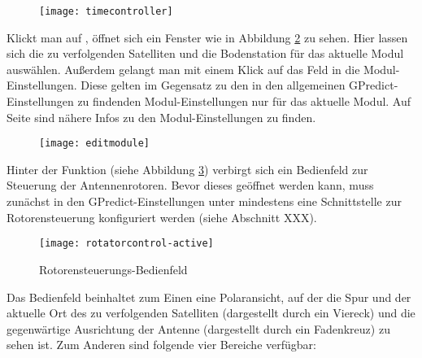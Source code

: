 \begin{figure}[h]
	\centering
	\texttt{[image: timecontroller]}
	\caption{}
	\label{fig:timecontroller} 
\end{figure}

Klickt man auf , öffnet sich ein Fenster wie in Abbildung \ref{fig:editmodule} zu sehen. Hier lassen sich die zu verfolgenden Satelliten und die Bodenstation für das aktuelle Modul auswählen. Außerdem gelangt man mit einem Klick auf das Feld  in die Modul-Einstellungen. Diese gelten im Gegensatz zu den in den allgemeinen GPredict-Einstellungen zu findenden Modul-Einstellungen nur für das aktuelle Modul. Auf Seite \pageref{modulesettingsgeneral} sind nähere Infos zu den Modul-Einstellungen zu finden.
\label{modulesettingsspecific}

\begin{figure}[h]
	\centering
	\texttt{[image: editmodule]}
	\caption{}
	\label{fig:editmodule} 
\end{figure}

\clearpage

Hinter der Funktion  (siehe Abbildung \ref{fig:rotatorcontrol}) verbirgt sich ein Bedienfeld zur Steuerung der Antennenrotoren. Bevor dieses geöffnet werden kann, muss zunächst in den GPredict-Einstellungen unter  mindestens eine Schnittstelle zur Rotorensteuerung konfiguriert werden (siehe Abschnitt XXX). 
\begin{figure}[h]
	\centering
	\texttt{[image: rotatorcontrol-active]}
	\caption{Rotorensteuerungs-Bedienfeld}
	\label{fig:rotatorcontrol} 
\end{figure}

Das Bedienfeld beinhaltet zum Einen eine Polaransicht, auf der die Spur und der aktuelle Ort des zu verfolgenden Satelliten (dargestellt durch ein Viereck) und die gegenwärtige Ausrichtung der Antenne (dargestellt durch ein Fadenkreuz) zu sehen ist. Zum Anderen sind folgende vier Bereiche verfügbar:

